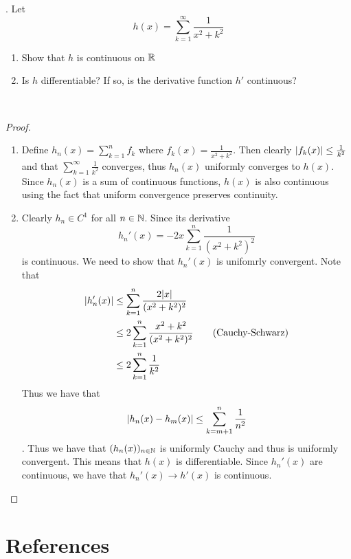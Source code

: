 \documentclass[a4paper]{article}
\begin{document}
\begin{qtn}{}{}
\thetcbcounter.\;\; Let $$h(x)=\sum_{k=1}^\infty\frac{1}{x^2+k^2}$$
\begin{enumerate}[label=\alph*)]
\item Show that $h$ is continuous on $\mathbb{R}$
\item Is $h$ differentiable? If so, is the derivative function $h'$ continuous?
\end{enumerate}~\\\hspace*{\fill}\cite{R0002}\tcbline
\begin{proof}~\\
\begin{enumerate}[label=\alph*)]
\item Define $h_n(x)=\sum_{k=1}^nf_k$ where $f_k(x)=\frac{1}{x^2+k^2}$. Then clearly $\abs{f_k(x)}\leq\frac{1}{k^2}$ and that $\sum_{k=1}^\infty\frac{1}{k^2}$ converges, thus $h_n(x)$ uniformly converges to $h(x)$. Since $h_n(x)$ is a sum of continuous functions, $h(x)$ is also continuous using the fact that uniform convergence preserves continuity. 
\item Clearly $h_n\in C^1$ for all $n\in\mathbb{N}$. Since its derivative $$h_n'(x)=-2x\sum_{k=1}^n\frac{1}{(x^2+k^2)^2}$$ is continuous. We need to show that $h_n'(x)$ is unifomrly convergent. Note that 
\begin{align*}
\abs{h_n'(x)}&\leq\sum_{k=1}^n\frac{2\abs{x}}{(x^2+k^2)^2}\\
&\leq2\sum_{k=1}^n\frac{x^2+k^2}{(x^2+k^2)^2}\tag{Cauchy-Schwarz}\\
&\leq2\sum_{k=1}^n\frac{1}{k^2}
\end{align*}
Thus we have that $$\abs{h_n(x)-h_m(x)}\leq\sum_{k=m+1}^n\frac{1}{n^2}$$. Thus we have that $(h_n(x))_{n\in\mathbb{N}}$ is uniformly Cauchy and thus is uniformly convergent. This means that $h(x)$ is differentiable. Since $h_n'(x)$ are continuous, we have that $h_n'(x)\to h'(x)$ is continuous. 
\end{enumerate}
\end{proof}
\end{qtn}

\pagebreak
\section{References}


\end{document}
